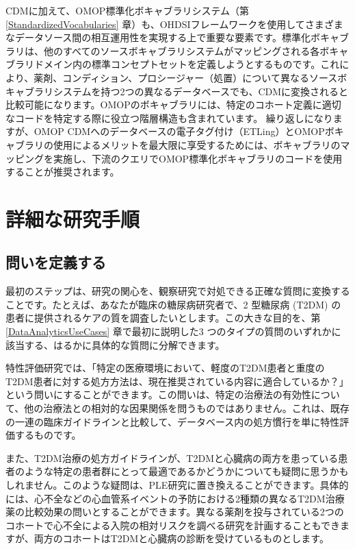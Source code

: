 \documentclass[
  11pt]{book}
\theoremstyle{definition}
\theoremstyle{definition}
\theoremstyle{definition}
\theoremstyle{definition}
\theoremstyle{remark}
\begin{document}
CDMに加えて、OMOP標準化ボキャブラリシステム（第 \ref{StandardizedVocabularies} 章）も、OHDSIフレームワークを使用してさまざまなデータソース間の相互運用性を実現する上で重要な要素です。標準化ボキャブラリは、他のすべてのソースボキャブラリシステムがマッピングされる各ボキャブラリドメイン内の標準コンセプトセットを定義しようとするものです。これにより、薬剤、コンディション、プロシージャー（処置）について異なるソースボキャブラリシステムを持つ2つの異なるデータベースでも、CDMに変換されると比較可能になります。OMOPのボキャブラリには、特定のコホート定義に適切なコードを特定する際に役立つ階層構造も含まれています。 繰り返しになりますが、OMOP CDMへのデータベースの電子タグ付け（ETLing）とOMOPボキャブラリの使用によるメリットを最大限に享受するためには、ボキャブラリのマッピングを実施し、下流のクエリでOMOP標準化ボキャブラリのコードを使用することが推奨されます。

\section{詳細な研究手順}\label{ux8a73ux7d30ux306aux7814ux7a76ux624bux9806}

\subsection{問いを定義する}\label{ux554fux3044ux3092ux5b9aux7fa9ux3059ux308b}

最初のステップは、研究の関心を、観察研究で対処できる正確な質問に変換することです。たとえば、あなたが臨床の糖尿病研究者で、2 型糖尿病 (T2DM) の患者に提供されるケアの質を調査したいとします。この大きな目的を、第 \ref{DataAnalyticsUseCases} 章で最初に説明した3 つのタイプの質問のいずれかに該当する、はるかに具体的な質問に分解できます。

特性評価研究では、「特定の医療環境において、軽度のT2DM患者と重度のT2DM患者に対する処方方法は、現在推奨されている内容に適合しているか？」という問いにすることができます。この問いは、特定の治療法の有効性について、他の治療法との相対的な因果関係を問うものではありません。これは、既存の一連の臨床ガイドラインと比較して、データベース内の処方慣行を単に特性評価するものです。

また、T2DM治療の処方ガイドラインが、T2DMと心臓病の両方を患っている患者のような特定の患者群にとって最適であるかどうかについても疑問に思うかもしれません。このような疑問は、PLE研究に置き換えることができます。具体的には、心不全などの心血管系イベントの予防における2種類の異なるT2DM治療薬の比較効果の問いとすることができます。異なる薬剤を投与されている2つのコホートで心不全による入院の相対リスクを調べる研究を計画することもできますが、両方のコホートはT2DMと心臓病の診断を受けているものとします。
\end{document}
